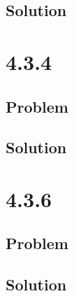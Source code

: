 \documentclass[12pt]{article}
\begin{document}
\subsection{Solution}

\newpage
\section{4.3.4}

\subsection{Problem}

\subsection{Solution}

\section{4.3.6}

\subsection{Problem}

\subsection{Solution}

\newpage


\nocite{El-Deeb_PEU-356_Assignments}
\end{document}
